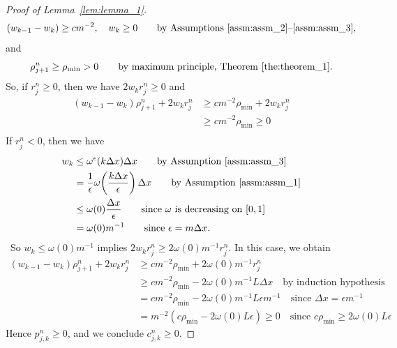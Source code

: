 \begin{proof}[Proof of Lemma~\ref{lem:lemma_1}]
    \[
        (w_{k-1} - w_k)\geq cm^{-2}, \quad w_k \geq 0 \qquad \text{by Assumptions~\ref{assm:assm_2}--\ref{assm:assm_3}},
    \]
    and
    \[
        \rho_{j+1}^n \geq \rho_{\min} > 0 \qquad \text{by maximum principle, Theorem~\ref{the:theorem_1}}.
    \]
    So, if $r_j^n \geq 0$, then we have $2w_k r_j^n \geq 0$ and
    \begin{align*}
        (w_{k-1} - w_k)\rho_{j+1}^n + 2w_k r_j^n & \geq cm^{-2}\rho_{\min} + 2w_k r_j^n \\
                                                 & \geq cm^{-2}\rho_{\min} \geq 0       \\
    \end{align*}
    If $r_j^n < 0$, then we have
    \begin{equation}\label{eq:w_k_equality}
        \begin{split}
            w_k & \leq \omega^{\epsilon}(k\Delta x) \Delta x \qquad \text{by Assumption~\ref{assm:assm_3}}                                     \\
                & = \frac{1}{\epsilon} \omega\!\left(\frac{k\Delta x}{\epsilon}\right) \Delta x  \qquad \text{by Assumption~\ref{assm:assm_1}} \\
                & \leq \omega(0) \frac{\Delta x}{\epsilon} \qquad \text{since $\omega$ is decreasing on $[0,1]$}                               \\
                & = \omega(0)m^{-1} \qquad \text{since $\epsilon = m \Delta x$}.
        \end{split}
    \end{equation}
    \
    So $w_k \leq \omega(0)m^{-1}$ implies  $2w_kr_j^n  \geq 2\omega(0)m^{-1} r_j^n $.
    In this case, we obtain
    \begin{align*}
        (w_{k-1} - w_k)\rho_{j+1}^n + 2w_k r_j^n & \geq cm^{-2}\rho_{\min} + 2\omega(0)m^{-1}r_j^n                                                                   \\
                                                 & \geq cm^{-2}\rho_{\min} - 2\omega(0)m^{-1}L\Delta x  \quad \text{by induction hypothesis}                         \\
                                                 & = cm^{-2}\rho_{\min} - 2\omega(0)m^{-1} L \epsilon m^{-1}   \quad \text{since $\Delta x = \epsilon m^{-1}$}       \\
                                                 & = m^{-2}( c\rho_{\min} - 2\omega(0)L \epsilon)\geq 0  \quad \text{since $c\rho_{\min} \geq 2\omega(0)L \epsilon$}
    \end{align*}
    Hence $p_{j,k}^n \geq 0$, and we conclude $c_{j,k}^n \geq 0$.
\end{proof}
